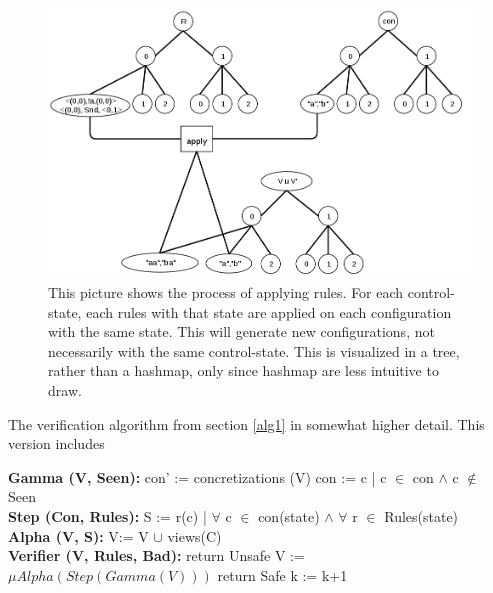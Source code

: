 \begin{figure}
\includegraphics[width=400pt] {bilder/applyrule.png}
\caption{This picture shows the process of applying rules. For each control-state, each rules with that state are applied on each configuration with the same state. This will generate new configurations, not necessarily with the same control-state. This is visualized in a tree, rather than a hashmap, only since hashmap are less intuitive to draw.}
\label{applyrule}
\end{figure}


\begin{algorithm}
  \caption{The verification algorithm from section \ref{alg1} in somewhat higher detail. This version includes }\label{euclid}
  \begin{algorithmic}[1]
    \State \textbf{Gamma (V, Seen):}
    \State \hspace{6 mm} con' := concretizations (V)
    \State \hspace{6 mm} con  := c | c $\in$ con $\land$ c $\notin$ Seen
    \\
    \State \textbf{Step (Con, Rules):}
    \State \hspace{6 mm} S := r(c) | $\forall$ c $\in$ con(state) $\land$ $\forall$ r $\in$ Rules(state)
    \EndFor
    \\            
    \State \textbf{Alpha (V, S):}
    \State \hspace{6 mm} V:= V $\cup$ views(C)
    \\
    \State \textbf{Verifier (V, Rules, Bad):}
        \State return Unsafe
        \EndIf
        \State V := $\mu Alpha(Step(Gamma(V)))$
        \State return Safe     
        \EndIf
        \State k := k+1
      \EndFor
\end{algorithmic}
\end{algorithm}



